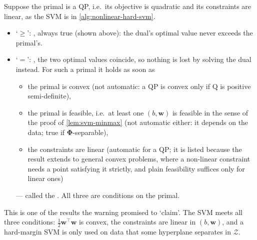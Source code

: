 \begin{fact}\label{fact:strong-duality}
    Suppose the primal is a QP, i.e.\ its objective is quadratic and its
    constraints are linear, as the SVM is in
    \autoref{alg:nonlinear-hard-svm}.
    \begin{itemize}
        \item `\(\ge\)': , always true (shown above): the
            dual's optimal value never exceeds the primal's.
        \item `\(=\)': , the two optimal values
            coincide, so nothing is lost by solving the dual instead. For
            such a primal it holds as soon as
            \begin{itemize}
                \item the primal is convex (not automatic: a QP is convex
                    only if \(\mathrm{Q}\) is positive semi-definite),
                \item the primal is feasible, i.e.\ at least one \((b,
                    \bm{w})\) is feasible in the sense of the proof of
                    \autoref{lem:svm-minmax} (not automatic either: it depends
                    on the data; true if \(\bm{\Phi}\)-separable),
                \item the constraints are linear (automatic for a QP; it is
                    listed because the result extends to general convex
                    problems, where a non-linear constraint needs a point
                    satisfying it strictly, and plain feasibility suffices
                    only for linear ones)
            \end{itemize}
            --- called the . All three are
            conditions on the primal.
    \end{itemize}
\end{fact}

This is one of the results the warning promised to `claim'. The SVM meets
all three conditions: \(\frac{1}{2} \bm{w}^\top \bm{w}\) is convex, the
constraints are linear in \((b, \bm{w})\), and a hard-margin SVM is only
used on data that some hyperplane separates in \(\mathcal{Z}\).


